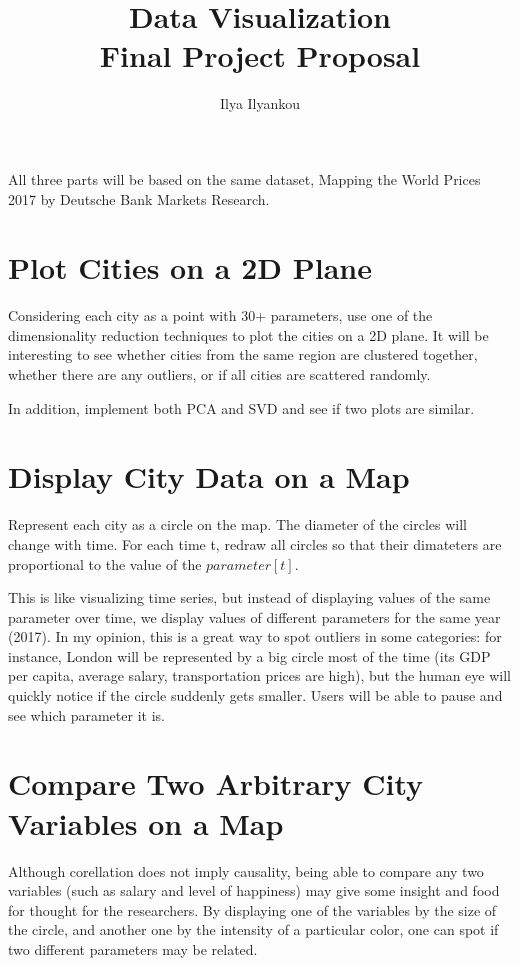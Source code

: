 \documentclass{article}
\begin{document}
\title{Data Visualization \\ Final Project Proposal}
\author{Ilya Ilyankou}
\date{}

\maketitle

All three parts will be based on the same dataset, Mapping the World Prices 2017 by Deutsche Bank Markets Research.

\section{Plot Cities on a 2D Plane}
Considering each city as a point with 30+ parameters, use one of the dimensionality reduction techniques to plot the cities on a 2D plane. It will be interesting to see whether cities from the same region are clustered together, whether there are any outliers, or if all cities are scattered randomly.

In addition, implement both PCA and SVD and see if two plots are similar.

\section{Display City Data on a Map}
Represent each city as a circle on the map. The diameter of the circles will change with time. For each time t, redraw all circles so that their dimateters are proportional to the value of the $parameter[t]$.

This is like visualizing time series, but instead of displaying values of the same parameter over time, we display values of different parameters for the same year (2017). In my opinion, this is a great way to spot outliers in some categories: for instance, London will be represented by a big circle most of the time (its GDP per capita, average salary, transportation prices are high), but the human eye will quickly notice if the circle suddenly gets smaller. Users will be able to pause and see which parameter it is.


\section{Compare Two Arbitrary City Variables on a Map}
Although corellation does not imply causality, being able to compare any two variables (such as salary and level of happiness) may give some insight and food for thought for the researchers. By displaying one of the variables by the size of the circle, and another one by the intensity of a particular color, one can spot if two different parameters may be related.


\href{https:}{}
\end{document}

